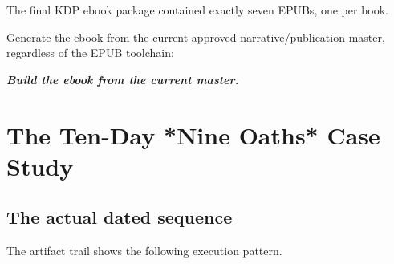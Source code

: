 \documentclass[11pt,oneside,openany]{book}
\renewenvironment{quote}{\begin{insightbox}\itshape}{\end{insightbox}}
\begin{document}
The final KDP ebook package contained exactly seven EPUBs, one per book.

Generate the ebook from the current approved narrative/publication master, regardless of the EPUB toolchain:

\begin{quote}
\textbf{Build the ebook from the current master.}
\end{quote}

\part{The Ten-Day *Nine Oaths* Case Study}

\chapter{The actual dated sequence}\label{the-actual-dated-sequence}

The artifact trail shows the following execution pattern.
\end{document}
